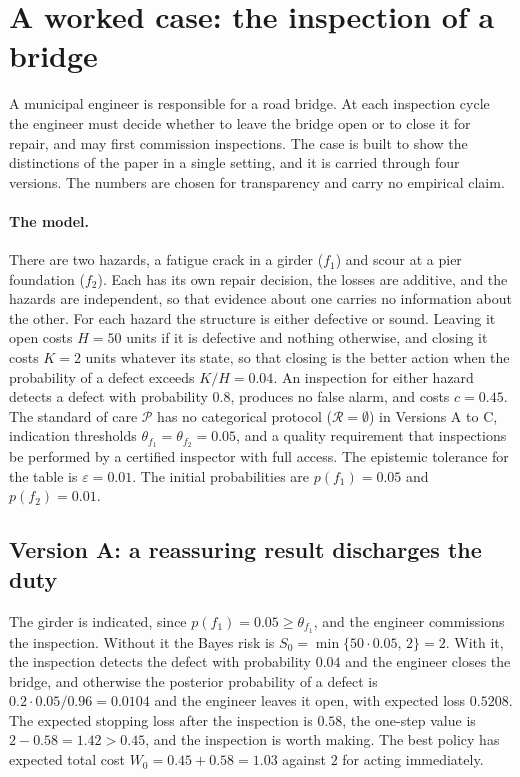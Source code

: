 \documentclass[11pt]{article}
\theoremstyle{plain}
\theoremstyle{definition}
\begin{document}
\section{A worked case: the inspection of a bridge}\label{sec:worked}

A municipal engineer is responsible for a road bridge. At each inspection cycle the engineer must decide whether to leave the bridge open or to close it for repair, and may first commission inspections. The case is built to show the distinctions of the paper in a single setting, and it is carried through four versions. The numbers are chosen for transparency and carry no empirical claim.

\paragraph{The model.} There are two hazards, a fatigue crack in a girder ($f_1$) and scour at a pier foundation ($f_2$). Each has its own repair decision, the losses are additive, and the hazards are independent, so that evidence about one carries no information about the other. For each hazard the structure is either defective or sound. Leaving it open costs $H=50$ units if it is defective and nothing otherwise, and closing it costs $K=2$ units whatever its state, so that closing is the better action when the probability of a defect exceeds $K/H=0.04$. An inspection for either hazard detects a defect with probability $0.8$, produces no false alarm, and costs $c=0.45$. The standard of care $\mathcal P$ has no categorical protocol ($\mathcal R=\emptyset$) in Versions A to C, indication thresholds $\theta_{f_1}=\theta_{f_2}=0.05$, and a quality requirement that inspections be performed by a certified inspector with full access. The epistemic tolerance for the table is $\varepsilon=0.01$. The initial probabilities are $p(f_1)=0.05$ and $p(f_2)=0.01$.

\subsection*{Version A: a reassuring result discharges the duty}

The girder is indicated, since $p(f_1)=0.05\ge\theta_{f_1}$, and the engineer commissions the inspection. Without it the Bayes risk is $S_0=\min\{50\cdot0.05,\,2\}=2$. With it, the inspection detects the defect with probability $0.04$ and the engineer closes the bridge, and otherwise the posterior probability of a defect is $0.2\cdot0.05/0.96=0.0104$ and the engineer leaves it open, with expected loss $0.5208$. The expected stopping loss after the inspection is $0.58$, the one-step value is $2-0.58=1.42>0.45$, and the inspection is worth making. The best policy has expected total cost $W_0=0.45+0.58=1.03$ against $2$ for acting immediately.
\end{document}
